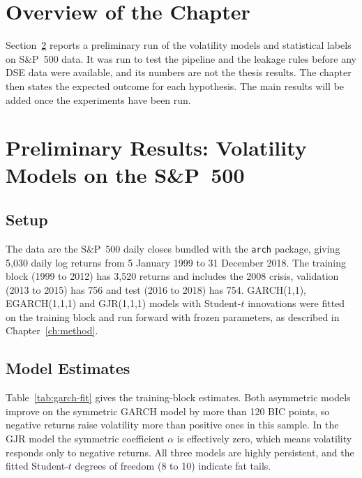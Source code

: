 
\section{Overview of the Chapter}
Section~\ref{sec:prelim} reports a preliminary run of the volatility models and statistical
labels on S\&P~500 data. It was run to test the pipeline and the leakage rules before any
DSE data were available, and its numbers are not the thesis results. The chapter then
states the expected outcome for each hypothesis. The main results will be added once the
experiments have been run.

\section{Preliminary Results: Volatility Models on the S\&P~500}\label{sec:prelim}

\subsection{Setup}
The data are the S\&P~500 daily closes bundled with the \texttt{arch} package, giving 5{,}030
daily log returns from 5 January 1999 to 31 December 2018. The training block (1999 to 2012)
has 3{,}520 returns and includes the 2008 crisis, validation (2013 to 2015) has 756 and test
(2016 to 2018) has 754. GARCH(1,1), EGARCH(1,1,1) and GJR(1,1,1) models with Student-$t$
innovations were fitted on the training block and run forward with frozen parameters, as
described in Chapter~\ref{ch:method}.

\subsection{Model Estimates}
Table~\ref{tab:garch-fit} gives the training-block estimates. Both asymmetric models improve
on the symmetric GARCH model by more than 120 BIC points, so negative returns raise volatility more than
positive ones in this sample. In the GJR model the symmetric coefficient $\alpha$ is
effectively zero, which means volatility responds only to negative returns. All three
models are highly persistent, and the fitted Student-$t$ degrees of freedom (8 to 10)
indicate fat tails.

